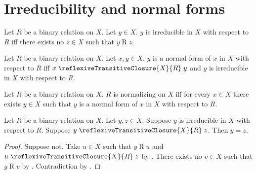 

\section{Irreducibility and normal forms}

\begin{definition}\label{irreducible_with_respect_to_on}
    Let $R$ be a binary relation on $X$.
    Let $y\in X$.
    $y$ is irreducible in $X$ with respect to $R$ iff
        there exists no $z\in X$ such that $y\mathrel{R}z$.
\end{definition}

\begin{definition}\label{normal_form_with_respect_to_on}
    Let $R$ be a binary relation on $X$.
    Let $x,y\in X$.
    $y$ is a normal form of $x$ in $X$ with respect to $R$ iff
        $x\mathrel{\reflexiveTransitiveClosure{X}{R}}y$ and
        $y$ is irreducible in $X$ with respect to $R$.
\end{definition}

\begin{definition}\label{normalizing_on}
    Let $R$ be a binary relation on $X$.
    $R$ is normalizing on $X$ iff for every $x\in X$ there exists $y\in X$
        such that $y$ is a normal form of $x$ in $X$ with respect to $R$.
\end{definition}

\begin{proposition}\label{irreducible_reflexive_transitive_elim}
    Let $R$ be a binary relation on $X$.
    Let $y,z\in X$.
    Suppose $y$ is irreducible in $X$ with respect to $R$.
    Suppose $y\mathrel{\reflexiveTransitiveClosure{X}{R}}z$.
    Then $y=z$.
\end{proposition}
\begin{proof}
    Suppose not.
    Take $u\in X$ such that $y\mathrel{R}u$ and
        $u\mathrel{\reflexiveTransitiveClosure{X}{R}}z$
        by .
    There exists no $v\in X$ such that $y\mathrel{R}v$
        by .
    Contradiction by \auto.
\end{proof}
